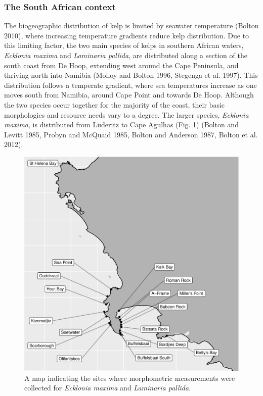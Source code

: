 \documentclass[10pt,a4,]{article}
\makeatletter
\def\maxwidth{\ifdim\Gin@nat@width>\linewidth\linewidth
\else\Gin@nat@width\fi}
\let\Oldincludegraphics\includegraphics
\renewcommand{\includegraphics}[1]{\Oldincludegraphics[width=\maxwidth]{#1}}
\makeatother
\begin{document}
\hypertarget{the-south-african-context}{%
\subsubsection{The South African
context}\label{the-south-african-context}}

The biogeographic distribution of kelp is limited by seawater
temperature (Bolton 2010), where increasing temperature gradients reduce
kelp distribution. Due to this limiting factor, the two main species of
kelps in southern African waters, \emph{Ecklonia maxima} and
\emph{Laminaria pallida}, are distributed along a section of the south
coast from De Hoop, extending west around the Cape Peninsula, and
thriving north into Namibia (Molloy and Bolton 1996, Stegenga et al.
1997). This distribution follows a temperate gradient, where sea
temperatures increase as one moves south from Namibia, around Cape Point
and towards De Hoop. Although the two species occur together for the
majority of the coast, their basic morphologies and resource needs vary
to a degree. The larger species, \emph{Ecklonia maxima}, is distributed
from Lüderitz to Cape Agulhas (Fig. 1) (Bolton and Levitt 1985, Probyn
and McQuaid 1985, Bolton and Anderson 1987, Bolton et al. 2012).

\begin{figure}
\centering
\includegraphics{chapter_2_files/figure-latex/unnamed-chunk-1-1.pdf}
\caption{A map indicating the sites where morphometric measurements were
collected for \emph{Ecklonia maxima} and \emph{Laminaria pallida}.}
\end{figure}
\end{document}

